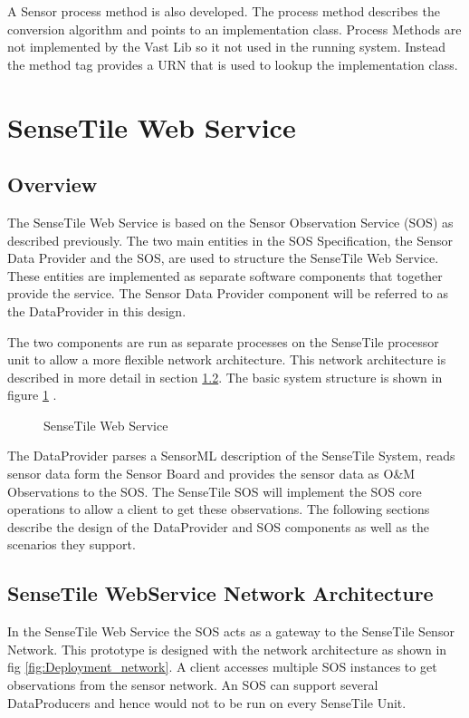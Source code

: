 \documentclass[]{final_report}
\begin{document}
A Sensor process method is also developed. The process method describes the conversion algorithm and points to an implementation class. Process Methods are not implemented by the Vast Lib so it not used in the running system. Instead the method tag provides a URN that is used to lookup the implementation class.

\section{SenseTile Web Service}
\subsection{Overview}

The SenseTile Web Service is based on the Sensor Observation Service (SOS) as described previously. The two main entities in the SOS Specification, the Sensor Data Provider and the SOS,  are used to structure the SenseTile Web Service. These entities are implemented as separate software components that together provide the service. The Sensor Data Provider component will be referred to as the DataProvider in this design.

The two components are run as separate processes on the SenseTile processor unit to allow a more flexible network architecture.  This network architecture is described in more detail in section \ref{subsec:SenseTile WebService Network Architecture}. The basic system structure is shown in figure \ref {fig:Deployment_sensetile} .

\begin{figure}[h]
\centering
{}
\caption{SenseTile Web Service}\label{fig:Deployment_sensetile}
\end{figure}

The DataProvider parses a SensorML description of the SenseTile System, reads sensor data form the Sensor Board and provides the sensor data as O\&M Observations to the SOS. The SenseTile SOS will implement the SOS core operations to allow a client to get these observations. The following sections describe the design of the DataProvider and SOS components as well as the scenarios they support.

\subsection{SenseTile WebService Network Architecture}
\label{subsec:SenseTile WebService Network Architecture}
In the SenseTile Web Service the SOS acts as a gateway to the SenseTile Sensor Network. This prototype is designed with the network architecture as shown in fig \ref{fig:Deployment_network}. A client accesses multiple SOS instances to get observations from the sensor network. An SOS can support several DataProducers and hence would not to be run on every SenseTile Unit. 
\end{document}
